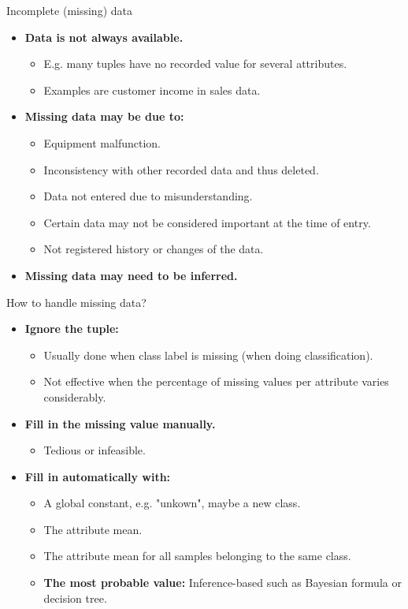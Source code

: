\documentclass[aspectratio=169,t]{beamer}
\begin{document}
  { 
    \begin{frame}{Incomplete (missing) data}
    \begin{itemize}
      \item \textbf{Data is not always available.}
      \begin{itemize}
        \item E.g. many tuples have no recorded value for several attributes.
        \item Examples are customer income in sales data.
      \end{itemize}
      \item \textbf{Missing data may be due to:}
      \begin{itemize}
        \item Equipment malfunction.
        \item Inconsistency with other recorded data and thus deleted.
        \item Data not entered due to misunderstanding.
        \item Certain data may not be considered important at the time of entry.
        \item Not registered history or changes of the data.
      \end{itemize}
      \item \textbf{Missing data may need to be inferred.}
    \end{itemize}
    \end{frame}
  }

  { 
    \begin{frame}{How to handle missing data?}
    \begin{itemize}
      \item \textbf{Ignore the tuple:}
      \begin{itemize}
        \item Usually done when class label is missing (when doing classification).
        \item Not effective when the percentage of missing values per attribute varies considerably.
      \end{itemize}
      \item \textbf{Fill in the missing value manually.}
      \begin{itemize}
        \item Tedious or infeasible.
      \end{itemize}
      \item \textbf{Fill in automatically with:}
      \begin{itemize}
        \item A global constant, e.g. "unkown", maybe a new class.
        \item The attribute mean.
        \item The attribute mean for all samples belonging to the same class.
        \item \textbf{\color{airforceblue} The most probable value:} Inference-based such as Bayesian formula or decision tree.
      \end{itemize}
    \end{itemize}
    \end{frame}
  }
\end{document}
